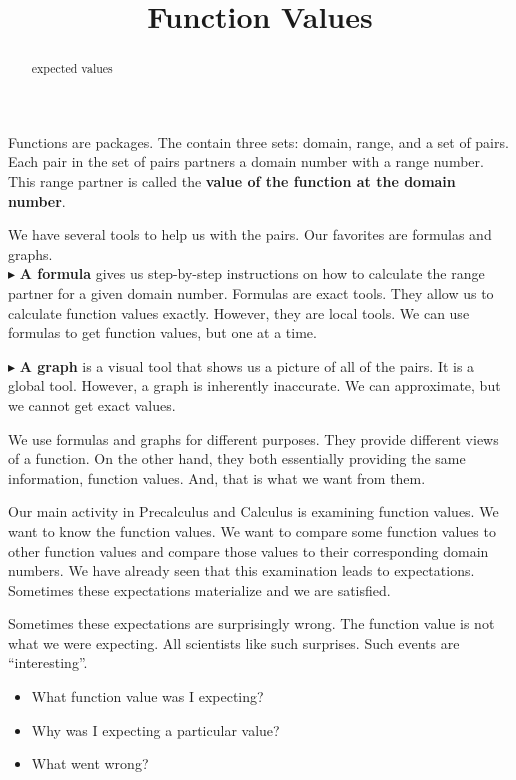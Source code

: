 \documentclass{ximera}
\title{Function Values}
\begin{document}
\begin{abstract}
expected values
\end{abstract}
\maketitle




Functions are packages.  The contain three sets: domain, range, and a set of pairs.  Each pair in the set of pairs partners a domain number with a range number.  This range partner is called the \textbf{value of the function \textcolor{purple!85!blue}{at} the domain number}.


We have several tools to help us with the pairs. Our favorites are formulas and graphs. \\


$\blacktriangleright$ \textbf{A formula} gives us step-by-step instructions on how to calculate the range partner for a given domain number.   Formulas are exact tools. They allow us to calculate function values exactly. However, they are local tools.  We can use formulas to get function values, but one at a time.


$\blacktriangleright$ \textbf{A graph} is a visual tool that shows us a picture of all of the pairs.  It is a global tool. However, a graph is inherently inaccurate.  We can approximate, but we cannot get exact values.  


We use formulas and graphs for different purposes. They provide different views of a function.  On the other hand, they both essentially providing the same information, function values. And, that is what we want from them.


Our main activity in Precalculus and Calculus is examining function values.  We want to know the function values.  We want to compare some function values to other function values and compare those values to their corresponding domain numbers.  We have already seen that this examination leads to expectations.  Sometimes these expectations materialize and we are satisfied.  

Sometimes these expectations are surprisingly wrong.  The function value is not what we were expecting. All scientists like such surprises. Such events are ``interesting''. 

\begin{itemize}
\item What function value was I expecting?
\item Why was I expecting a particular value?
\item What went wrong?
\end{itemize} 
\end{document}
